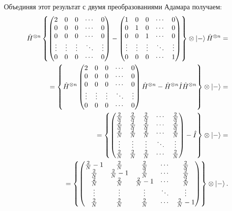 Объединяя этот результат с двумя преобразованиями Адамара 
получаем:
\begin{eqnarray}
\hat{H}^{\otimes n}
\left\{
\begin{pmatrix}
2  & 0 & 0 & \cdots & 0 \\
0 & 0 & 0 & \cdots & 0 \\
0 & 0 & 0 & \cdots & 0 \\
\vdots & \vdots & \vdots & \ddots & \vdots \\
0 & 0 & 0  & \cdots & 0 \\
\end{pmatrix} - 
\begin{pmatrix}
1 & 0 & 0 & \cdots & 0 \\
0 & 1 & 0 & \cdots & 0 \\
0 & 0 & 1 & \cdots & 0 \\
\vdots & \vdots & \vdots & \ddots & \vdots \\
0 & 0 & 0  & \cdots & 1  \\
\end{pmatrix}
\right\}
\otimes \ket{-}
\hat{H}^{\otimes n}
=
\nonumber \\
=
\left\{
\hat{H}^{\otimes n}
\begin{pmatrix}
2  & 0 & 0 & \cdots & 0 \\
0 & 0 & 0 & \cdots & 0 \\
0 & 0 & 0 & \cdots & 0 \\
\vdots & \vdots & \vdots & \ddots & \vdots \\
0 & 0 & 0  & \cdots & 0 \\
\end{pmatrix}
\hat{H}^{\otimes n}
- \hat{H}^{\otimes n} \hat{I} \hat{H}^{\otimes n}
\right\}
\otimes \ket{-}
 = 
\nonumber \\
=
\left\{
\begin{pmatrix}
\frac{2}{N}  & \frac{2}{N} & \frac{2}{N} & \cdots & \frac{2}{N} \\
\frac{2}{N} & \frac{2}{N} & \frac{2}{N} & \cdots & \frac{2}{N} \\
\frac{2}{N} & \frac{2}{N} & \frac{2}{N} & \cdots & \frac{2}{N} \\
\vdots & \vdots & \vdots & \ddots & \vdots \\
\frac{2}{N} & \frac{2}{N} & \frac{2}{N} & \cdots & \frac{2}{N} \\
\end{pmatrix} - \hat{I}
\right\}
\otimes \ket{-}
=
\nonumber \\
=
\left\{
\begin{pmatrix}
\frac{2}{N} - 1  & \frac{2}{N} & \frac{2}{N} & \cdots & \frac{2}{N} \\
\frac{2}{N} & \frac{2}{N} - 1 & \frac{2}{N} & \cdots & \frac{2}{N} \\
\frac{2}{N} & \frac{2}{N} & \frac{2}{N} - 1 & \cdots & \frac{2}{N} \\
\vdots & \vdots & \vdots & \ddots & \vdots \\
\frac{2}{N} & \frac{2}{N} & \frac{2}{N} & \cdots & \frac{2}{N} - 1\\
\end{pmatrix}
\right\}
\otimes \ket{-}.
\label{eqQuantCompGroverMeanInvImpl}
\end{eqnarray}

